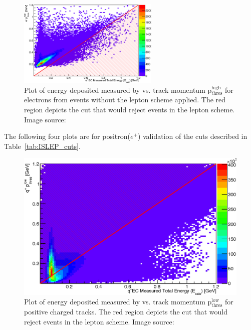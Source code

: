 \begin{figure}\begin{center}
\includegraphics[width=0.6\textwidth]{figures/lepton/Pim_EChighcut.eps}
\caption[ Deposited Energy Comparison to Track Momentum for e$^-$ from \π[0] Events]{\label{fig:islep.pimECcut}Plot of energy deposited measured by  vs. track momentum p$\mathrm{_{thres}^{high}}$ for electrons from \π[0] events without the  lepton   scheme applied. The red region depicts the cut that would reject events in the  lepton   scheme. Image source:~\cite{clas.thesis.kunkel}}
\end{center}\end{figure}
\FloatBarrier
The following four plots are for positron($e^+$)  validation of the  
cuts described in Table~\ref{tab:ISLEP_cuts}.
%
%
%
%
\begin{figure}\begin{center}
\includegraphics[width=0.9\columnwidth]{figures/lepton/Pip_EClow.eps}
\caption[ Deposited Energy Comparison to Lower Threshold Track Momentum for q$^+$ Tracks]{\label{fig:islep.pipEClow}Plot of energy deposited measured by  vs. track momentum p$\mathrm{_{thres}^{low}}$ for positive charged tracks. The red region depicts the cut that would reject events in the  lepton   scheme. Image source:~\cite{clas.thesis.kunkel}}
\end{center}\end{figure}

